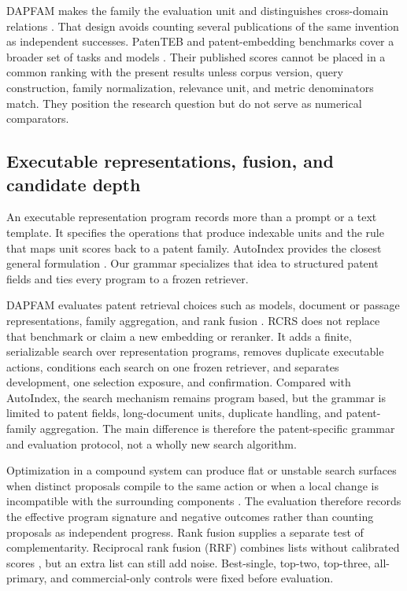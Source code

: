 \documentclass[final,5p,times,twocolumn]{elsarticle}
\begin{document}
DAPFAM makes the family the evaluation unit and distinguishes cross-domain
relations \cite{dapfam2026}. That design avoids counting several publications
of the same invention as independent successes. PatenTEB and patent-embedding
benchmarks cover a broader set of tasks and models
\cite{patenteb2025,patentembeddings2026}. Their published scores cannot be
placed in a common ranking with the present results unless corpus version,
query construction, family normalization, relevance unit, and metric
denominators match. They position the research question but do not serve as
numerical comparators.

\subsection{Executable representations, fusion, and candidate depth}

An executable representation program records more than a prompt or a text
template. It specifies the operations that produce indexable units and the
rule that maps unit scores back to a patent family. AutoIndex provides the
closest general formulation \cite{autoindex2026}. Our grammar specializes
that idea to structured patent fields and ties every program to a frozen
retriever.

DAPFAM evaluates patent retrieval choices such as models, document or passage
representations, family aggregation, and rank fusion \cite{dapfam2026}.
RCRS does not replace that benchmark or claim a new embedding or reranker. It
adds a finite, serializable search over representation programs, removes
duplicate executable actions, conditions each search on one frozen retriever,
and separates development, one selection exposure, and confirmation.
Compared with AutoIndex, the search mechanism remains program based, but the
grammar is limited to patent fields, long-document units, duplicate handling,
and patent-family aggregation. The main difference is therefore the
patent-specific grammar and evaluation protocol, not a wholly new search
algorithm.

Optimization in a compound system can produce flat or unstable search
surfaces when distinct proposals compile to the same action or when a local
change is incompatible with the surrounding components
\cite{promptcoinflip2026}. The evaluation therefore records the effective
program signature and negative outcomes rather than counting proposals as
independent progress.
Rank fusion supplies a separate test of complementarity. Reciprocal rank
fusion (RRF) combines lists without calibrated scores \cite{rrf2009}, but an
extra list can still add noise. Best-single, top-two, top-three, all-primary,
and commercial-only controls were fixed before evaluation.
\end{document}
